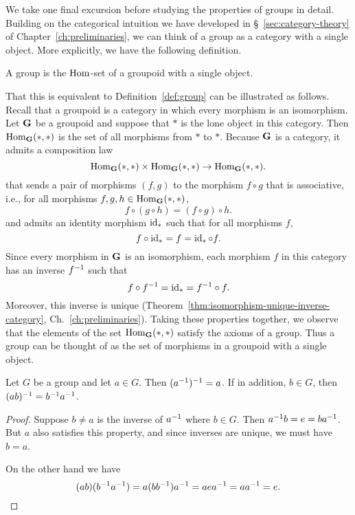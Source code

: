 We take one final excursion before studying the properties of groups in detail.
Building on the categorical intuition we have developed in
\S~\ref{sec:category-theory} of Chapter~\ref{ch:preliminaries}, we can think of
a group as a category with a single object. More explicitly, we have the
following definition.

\begin{definition}
    A group is the \(\operatorname{Hom}\)-set of a groupoid with a single object.
\end{definition}

That this is equivalent to Definition~\ref{def:group} can be illustrated as
follows. Recall that a groupoid is a category in which every morphism is an
isomorphism. Let \(\mathbf{G}\) be a groupoid and suppose that \(*\) is the lone
object in this category. Then \(\operatorname{Hom}_{\mathbf{G}}(*, *)\) is the set of all
morphisms from \(*\) to \(*\). Because \(\mathbf{G}\) is a category, it admits a
composition law
\[
    \operatorname{Hom}_{\mathbf{G}}(*, *) \times \operatorname{Hom}_{\mathbf{G}}(*, *) \to \operatorname{Hom}_{\mathbf{G}}(*, *).
\]
that sends a pair of morphisms \((f, g)\) to the morphism \(f \circ g\) that is
associative, i.e., for all morphisms \(f, g, h \in \operatorname{Hom}_{\mathbf{G}}(*, *)\),
\[
    f \circ (g \circ h) = (f \circ g) \circ h.
\]
and admits an identity morphism \(\operatorname{id}_{*}\) such that for all morphisms \(f\),
\[
    f \circ \operatorname{id}_{*} = f = \operatorname{id}_{*} \circ f.
\]
Since every morphism in \(\mathbf{G}\) is an isomorphism, each morphism \(f\) in
this category has an inverse \(f^{-1}\) such that
\[
    f \circ f^{-1} = \operatorname{id}_{*} = f^{-1} \circ f.
\]
Moreover, this inverse is unique
(Theorem~\ref{thm:isomorphism-unique-inverse-category},
Ch.~\ref{ch:preliminaries}). Taking these properties together, we observe that
the elements of the set \(\operatorname{Hom}_{\mathbf{G}}(*, *)\) satisfy the axioms of a group.
Thus a group can be thought of as the set of morphisms in a groupoid with a
single object.

\begin{theorem}
    \label{thm:group-inverses}
    Let \(G\) be a group and let \(a \in G\). Then \((a^{-1})^{-1} = a\). If in
    addition, \(b \in G\), then \((ab)^{-1} = b^{-1} a^{-1}\).
\end{theorem}

\begin{proof}
    Suppose \(b \neq a\) is the inverse of \(a^{-1}\) where \(b \in G\). Then
    \(a^{-1} b = e = ba^{-1}\). But \(a\) also satisfies this property, and since
    inverses are unique, we must have \(b = a\).

    On the other hand we have
    \[
        (ab)(b^{-1} a^{-1}) = a(bb^{-1})a^{-1} = aea^{-1} = aa^{-1} = e.
    \]
\end{proof}


